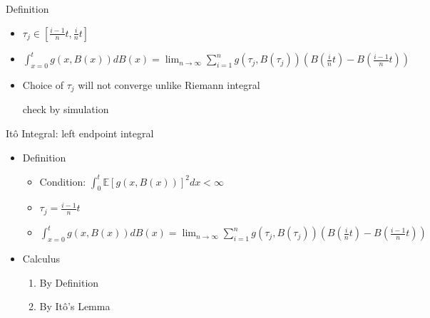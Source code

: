 \documentclass[a4paper]{article}
\begin{document}
\begin{itemize}
        Definition
        \begin{itemize}
            \item $\tau_j \in [ \frac{i-1}{n}t, \frac{i}{n}t]$
            \item $\int_{x=0}^t g(x, B(x)) dB(x) = \lim_{n \rightarrow \infty} \sum_{i=1}^n g(\tau_j, B(\tau_j))(B(\frac{i}{n}t) - B(\frac{i-1}{n}t))$
            \item Choice of $\tau_j$ will not converge unlike Riemann integral

                check by simulation
        \end{itemize}
        It\^{o} Integral: left endpoint integral
        \begin{itemize}
            \item Definition
                \begin{itemize}
                    \item Condition: $\int_0^t \mathbb{E}[g(x, B(x))]^2 dx < \infty$
                    \item $\tau_j = \frac{i-1}{n}t$
                    \item $\int_{x=0}^t g(x, B(x)) dB(x) = \lim_{n \rightarrow \infty} \sum_{i=1}^n g(\tau_j, B(\tau_j))(B(\frac{i}{n}t) - B(\frac{i-1}{n}t))$
                \end{itemize}
            \item Calculus
                \begin{enumerate}
                    \item By Definition
                    \item By It\^{o}'s Lemma


\end{enumerate}
\end{itemize}
\end{itemize}
\end{document}
